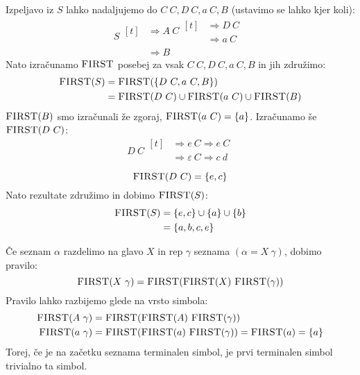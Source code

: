 \documentclass{article}
\newcommand{\FIRST}{\textsc{FIRST}}
\newcommand{\Null}{\varepsilon}
\newcommand{\Derive}{\Rightarrow}
\newcommand{\Seq}{\ }
\begin{document}
  Izpeljavo iz $S$ lahko nadaljujemo do $C \Seq C, D \Seq C, a \Seq C, B$ (ustavimo se lahko kjer koli):
  \begin{equation*}
    S \begin{aligned}[t]
      &\Derive A \Seq C \begin{aligned}[t]
        &\Derive D \Seq C\\
        &\Derive a \Seq C
      \end{aligned}\\
    &\Derive B
    \end{aligned}
  \end{equation*}
  Nato izračunamo $\FIRST$ posebej za vsak $C \Seq C, D \Seq C, a \Seq C, B$ in jih združimo:
  \begin{align*}
    \FIRST(S) &= \FIRST(\{D \Seq C, a \Seq C, B\}) \\
              &= \FIRST(D \Seq C) \cup \FIRST(a \Seq C) \cup \FIRST(B)
  \end{align*}
  $\FIRST(B)$ smo izračunali že zgoraj, $\FIRST(a \Seq C) = \{a\}$.
  Izračunamo še $\FIRST(D \Seq C)$:
  \begin{equation*}
    D \Seq C \begin{aligned}[t]
      &\Derive e \Seq C \Derive e \Seq C \\
      &\Derive \Null \Seq C \Derive c \Seq d \\
    \end{aligned}
  \end{equation*}
  \begin{equation*}
    \FIRST(D \Seq C) = \{e, c\}
  \end{equation*}
  Nato rezultate združimo in dobimo $\FIRST(S)$:
  \begin{align*}
    \FIRST(S) &= \{e, c\} \cup \{a\} \cup \{b\} \\
              &= \{a, b, c, e\}
  \end{align*}

Če seznam $\alpha$ razdelimo na glavo $X$ in rep $\gamma$ seznama ${(\alpha = X \Seq \gamma)}$, dobimo pravilo:
\begin{equation*}
  \FIRST(X \Seq \gamma) = \FIRST(\FIRST(X) \Seq \FIRST(\gamma))
\end{equation*}
Pravilo lahko razbijemo glede na vrsto simbola:
\begin{align*}
  \FIRST(A \Seq \gamma) &= \FIRST(\FIRST(A) \Seq \FIRST(\gamma))\\
  \FIRST(a \Seq \gamma) &= \FIRST(\FIRST(a) \Seq \FIRST(\gamma)) = \FIRST(a) = \{a\}
\end{align*}
Torej, če je na začetku seznama terminalen simbol, je prvi terminalen simbol trivialno ta simbol.
\end{document}

